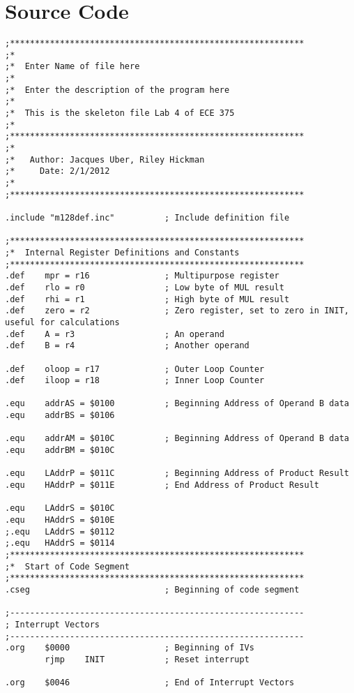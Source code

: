 \documentclass[12pt,letterpaper]{article}
\begin{document}
\section{Source Code}
\begin{verbatim}
;***********************************************************
;*
;*  Enter Name of file here
;*
;*  Enter the description of the program here
;*
;*  This is the skeleton file Lab 4 of ECE 375
;*
;***********************************************************
;*
;*   Author: Jacques Uber, Riley Hickman
;*     Date: 2/1/2012
;*
;***********************************************************

.include "m128def.inc"          ; Include definition file

;***********************************************************
;*  Internal Register Definitions and Constants
;***********************************************************
.def    mpr = r16               ; Multipurpose register
.def    rlo = r0                ; Low byte of MUL result
.def    rhi = r1                ; High byte of MUL result
.def    zero = r2               ; Zero register, set to zero in INIT, useful for calculations
.def    A = r3                  ; An operand
.def    B = r4                  ; Another operand

.def    oloop = r17             ; Outer Loop Counter
.def    iloop = r18             ; Inner Loop Counter

.equ    addrAS = $0100          ; Beginning Address of Operand B data
.equ    addrBS = $0106

.equ    addrAM = $010C          ; Beginning Address of Operand B data
.equ    addrBM = $010C

.equ    LAddrP = $011C          ; Beginning Address of Product Result
.equ    HAddrP = $011E          ; End Address of Product Result

.equ    LAddrS = $010C
.equ    HAddrS = $010E
;.equ   LAddrS = $0112
;.equ   HAddrS = $0114
;***********************************************************
;*  Start of Code Segment
;***********************************************************
.cseg                           ; Beginning of code segment

;-----------------------------------------------------------
; Interrupt Vectors
;-----------------------------------------------------------
.org    $0000                   ; Beginning of IVs
        rjmp    INIT            ; Reset interrupt

.org    $0046                   ; End of Interrupt Vectors


\end{verbatim}
\end{document}
